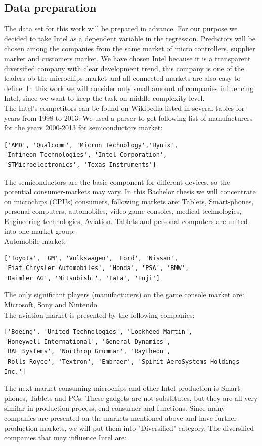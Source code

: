 \documentclass{article}
\begin{document}
\subsection{Data preparation}
The data set for this work will be prepared in advance. For our purpose we decided to take Intel as a dependent variable in the regression. Predictors will be chosen among the companies from the same market of micro controllers, supplier market and customers market. We have chosen Intel because it is a transparent diversified company with clear development trend, this company is one of the leaders ob the microchips market and all connected markets are also easy to define. In this work we will consider only small amount of companies influencing Intel, since we want to keep the task on middle-complexity level.\\
The Intel's competitors can be found on Wikipedia listed in several tables for years from 1998 to 2013. We used a parser to get following list of manufacturers for the years 2000-2013 for semiconductors market:
\begin{verbatim}
['AMD', 'Qualcomm', 'Micron Technology','Hynix',
'Infineon Technologies', 'Intel Corporation', 
'STMicroelectronics', 'Texas Instruments']
\end{verbatim}
The semiconductors are the basic component for different devices, so the potential consumer-markets may vary. In this Bachelor thesis we will concentrate on microchips (CPUs) consumers, following markets are: Tablets, Smart-phones, personal computers, automobiles, video game consoles, medical technologies, Engineering technologies, Aviation. Tablets and personal computers are united into one market-group.\\
Automobile market:
\begin{verbatim}
['Toyota', 'GM', 'Volkswagen', 'Ford', 'Nissan', 
'Fiat Chrysler Automobiles', 'Honda', 'PSA', 'BMW',
'Daimler AG', 'Mitsubishi', 'Tata', 'Fuji']
\end{verbatim}
The only significant players (manufacturers) on the game console market are: Microsoft, Sony and Nintendo.\\ 
The aviation market is presented by the following companies: 
\begin{verbatim}
['Boeing', 'United Technologies', 'Lockheed Martin',
'Honeywell International', 'General Dynamics',
'BAE Systems', 'Northrop Grumman', 'Raytheon',
'Rolls Royce', 'Textron', 'Embraer', 'Spirit AeroSystems Holdings Inc.']
\end{verbatim}
The next market consuming microchips and other Intel-production is Smart-phones, Tablets and PCs. These gadgets are not substitutes, but they are all very similar in production-process, end-consumer and functions. Since many companies are presented on the markets mentioned above and have further production markets, we will put them into "Diversified" category. The diversified companies that may influence Intel are:
\end{document}
